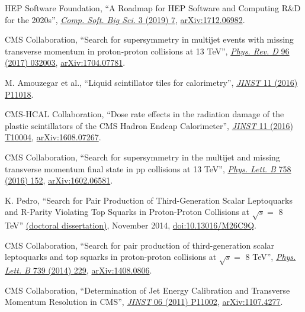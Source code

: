 \begin{description}[leftmargin=12pt,font=\normalfont,labelsep=0em]
\item HEP Software Foundation, ``A Roadmap for HEP Software and Computing R\&D for the 2020s'', \href{https://doi.org/10.1007/s41781-018-0018-8}{\emph{Comp. Soft. Big Sci.} 3 (2019) 7}, \href{https://arxiv.org/abs/1712.06982}{arXiv:1712.06982}. %
\item CMS Collaboration, ``Search for supersymmetry in multijet events with missing transverse momentum in proton-proton collisions at 13 TeV'', \href{http://dx.doi.org/10.1103/PhysRevD.96.032003}{\emph{Phys. Rev. D} 96 (2017) 032003}, \href{http://arxiv.org/abs/1704.07781}{arXiv:1704.07781}. %
\item M. Amouzegar et al., ``Liquid scintillator tiles for calorimetry'', \href{http://dx.doi.org/10.1088/1748-0221/11/11/P11018}{\emph{JINST} 11 (2016) P11018}. %
\item CMS-HCAL Collaboration, ``Dose rate effects in the radiation damage of the plastic scintillators of the CMS Hadron Endcap Calorimeter'', \href{http://dx.doi.org/10.1088/1748-0221/11/10/T10004}{\emph{JINST} 11 (2016) T10004}, \href{http://arxiv.org/abs/1608.07267}{arXiv:1608.07267}. %
\item CMS Collaboration, ``Search for supersymmetry in the multijet and missing transverse momentum final state in pp collisions at 13 TeV'', \href{http://dx.doi.org/10.1016/j.physletb.2016.05.002}{\emph{Phys. Lett. B} 758 (2016) 152}, \href{http://arxiv.org/abs/1602.06581}{arXiv:1602.06581}. %
\item K. Pedro, ``Search for Pair Production of Third-Generation Scalar Leptoquarks and R-Parity Violating Top Squarks in Proton-Proton Collisions at $\sqrt{s} =$ 8 TeV'' \href{http://cds.cern.ch/record/1968611}{(doctoral dissertation)}, November 2014, \href{https://doi.org/10.13016/M26C9Q}{doi:10.13016/M26C9Q}. %
\item CMS Collaboration, ``Search for pair production of third-generation scalar leptoquarks and top squarks in proton-proton collisions at $\sqrt{s} =$ 8 TeV'', \href{http://dx.doi.org/10.1016/j.physletb.2014.10.063}{\emph{Phys. Lett. B} 739 (2014) 229}, \href{http://arxiv.org/abs/1408.0806}{arXiv:1408.0806}. %
\item CMS Collaboration, ``Determination of Jet Energy Calibration and Transverse Momentum Resolution in CMS'', \href{http://dx.doi.org/10.1088/1748-0221/6/11/P11002}{\emph{JINST} 06 (2011) P11002}, \href{http://arxiv.org/abs/1107.4277}{arXiv:1107.4277}. %
\end{description}

